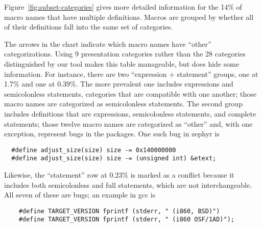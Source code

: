 \documentclass[10pt]{article}
\newcommand{\pkg}[1]{\textsf{#1}}
\begin{document}

Figure~\ref{fig:subset-categories} gives more detailed information for the
14\% of macro names that have multiple definitions.  Macros are grouped by
whether all of their definitions fall into the same set of categories.


The arrows in the chart indicate which macro names have ``other''
categorizations.  Using 9 presentation categories rather than the 28
categories distinguished by our tool makes this table manageable, but does
hide some information.  For instance, there are two ``expression +
statement'' groups, one at 1.7\% and one at 0.39\%.  The more prevalent one
includes expressions and semicolonless statements, categories that are
compatible with one another; those macro names are categorized as
semicolonless statements.  The second group includes definitions that are
expressions, semicolonless statements, and complete statements; those twelve macro
names are categorized as ``other'' and, with one exception, represent bugs in the
packages.  One such bug in \pkg{zephyr} is
\begin{verbatim}
  #define adjust_size(size) size -= 0x140000000
  #define adjust_size(size) size -= (unsigned int) &etext;
\end{verbatim}


Likewise, the ``statement'' row at 0.23\% is marked as a conflict because
it includes both semicolonless and full statements, which are not
interchangeable.  All seven of these are bugs; an example in \pkg{gcc} is
\begin{verbatim}
    #define TARGET_VERSION fprintf (stderr, " (i860, BSD)")
    #define TARGET_VERSION fprintf (stderr, " (i860 OSF/1AD)");
\end{verbatim}
\end{document}
